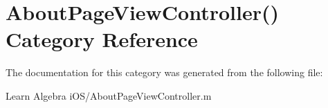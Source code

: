 \hypertarget{category_about_page_view_controller_07_08}{\section{About\-Page\-View\-Controller() Category Reference}
\label{category_about_page_view_controller_07_08}
}


The documentation for this category was generated from the following file\-:\begin{DoxyCompactItemize}
\item 
Learn Algebra i\-O\-S/About\-Page\-View\-Controller.\-m\end{DoxyCompactItemize}
